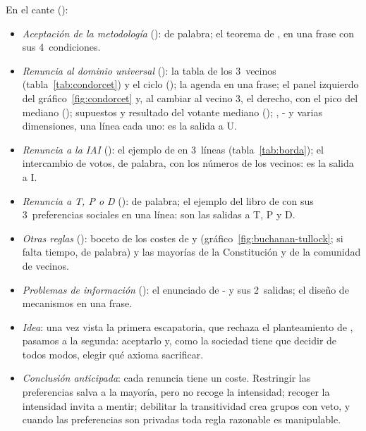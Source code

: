 \documentclass[11pt]{article}
\begin{document}
\begin{notaopositor}
En el cante ():
\begin{itemize}
\item \emph{Aceptación de la metodología} (): de palabra; el teorema de , en una frase con sus 4~condiciones.
\item \emph{Renuncia al dominio universal} (): la tabla de los 3~vecinos (tabla~\ref{tab:condorcet}) y el ciclo (); la agenda en una frase; el panel izquierdo del gráfico~\ref{fig:condorcet} y, al cambiar al vecino 3, el derecho, con el pico del mediano (); supuestos y resultado del votante mediano (); , - y varias dimensiones, una línea cada uno: es la salida a U.
\item \emph{Renuncia a la IAI} (): el ejemplo de  en 3~líneas (tabla~\ref{tab:borda}); el intercambio de votos, de palabra, con los números de los vecinos: es la salida a I.
\item \emph{Renuncia a T, P o D} (): de palabra; el ejemplo del libro de  con sus 3~preferencias sociales en una línea: son las salidas a T, P y D.
\item \emph{Otras reglas} (): boceto de los costes de  y  (gráfico~\ref{fig:buchanan-tullock}; si falta tiempo, de palabra) y las mayorías de la Constitución y de la comunidad de vecinos.
\item \emph{Problemas de información} (): el enunciado de - y sus 2~salidas; el diseño de mecanismos en una frase.
\end{itemize}
\end{notaopositor}

\begin{itemize}
\item \emph{Idea}: una vez vista la primera escapatoria, que rechaza el planteamiento de , pasamos a la segunda: aceptarlo y, como la sociedad tiene que decidir de todos modos, elegir qué axioma sacrificar.
\item \emph{Conclusión anticipada}: cada renuncia tiene un coste. Restringir las preferencias salva a la mayoría, pero no recoge la intensidad; recoger la intensidad invita a mentir; debilitar la transitividad crea grupos con veto, y cuando las preferencias son privadas toda regla razonable es manipulable.
\end{itemize}
\end{document}
